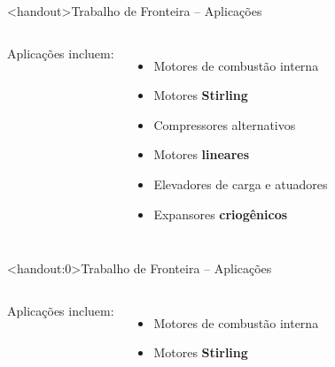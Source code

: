     \begin{frame}<handout>{Trabalho de Fronteira -- Aplicações}\vspace*{-2em}
        \begin{columns}
        Aplicações incluem:                                             \\[\medskipamount]
        \begin{itemize}
            \item Motores de combustão interna                          \\[\medskipamount]
            \item Motores \textbf{\alert{Stirling}}                     \\[\medskipamount]
            \item Compressores alternativos                             \\[\medskipamount]
            \item Motores \textbf{\alert{lineares}}                     \\[\medskipamount]
            \item Elevadores de carga e atuadores                       \\[\medskipamount]
            \item Expansores \textbf{\alert{criogênicos}}
        \end{itemize}
            \mbox{~}
        \end{columns}
    \end{frame}

    \begin{frame}<handout:0>{Trabalho de Fronteira -- Aplicações}\vspace*{-2em}
        \begin{columns}
        Aplicações incluem: \\[\medskipamount]
        \begin{itemize}
            \item Motores de combustão interna
            \item Motores \textbf{\alert{Stirling}}
        \end{itemize}
        \end{columns}
    \end{frame}

